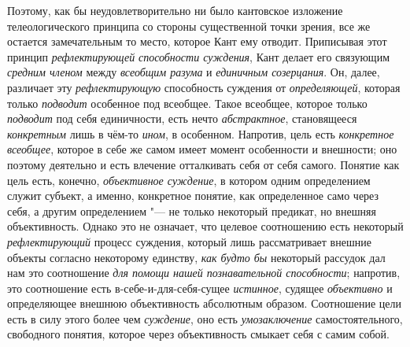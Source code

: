 {{Поэтому, как бы неудовлетворительно ни было кантовское
изложение телеологического принципа со стороны существенной точки зрения,
все же остается замечательным то место, которое Кант ему отводит.
Приписывая этот принцип
{\em рефлектирующей}
{\em способности суждения},
Кант делает его связующим
{\em средним членом}
между {\em всеобщим
разума} и {\em единичным
созерцания}. Он, далее, различает эту
{\em рефлектирующую}
способность суждения от
{\em определяющей},
которая только
{\em подводит} особенное
под всеобщее. Такое всеобщее, которое только
{\em подводит} под себя
единичности, есть нечто
{\em абстрактное},
становящееся
{\em конкретным} лишь в
чём-то {\em ином}, в
особенном. Напротив, цель есть
{\em конкретное всеобщее},
которое в себе же самом имеет момент особенности и внешности;
оно поэтому деятельно и есть влечение отталкивать себя от себя самого.
Понятие как цель есть, конечно,
{\em объективное суждение},
в котором одним определением служит субъект, а именно,
конкретное понятие, как определенное само через себя, а другим
определением "--- не только некоторый предикат, но внешняя
объективность. Однако это не означает, что целевое соотношению есть
некоторый {\em рефлектирующий}
процесс суждения, который лишь рассматривает внешние объекты
согласно некоторому единству, {\em как
будто бы} некоторый рассудок дал нам это соотношение
{\em для помощи нашей познавательной
способности}; напротив, это соотношение есть
в-себе-и-для-себя-сущее {\em истинное},
судящее {\em объективно}
и определяющее внешнюю объективность абсолютным образом.
Соотношение цели есть в силу этого более чем
{\em суждение}, оно есть
{\em умозаключение}
самостоятельного, свободного понятия, которое через
объективность смыкает себя с самим собой.

}}
